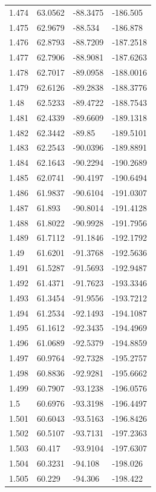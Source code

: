 \begin{tabular}{llll}
1.474 & 63.0562 & -88.3475 & -186.505 \\
1.475 & 62.9679 & -88.534 & -186.878 \\
1.476 & 62.8793 & -88.7209 & -187.2518 \\
1.477 & 62.7906 & -88.9081 & -187.6263 \\
1.478 & 62.7017 & -89.0958 & -188.0016 \\
1.479 & 62.6126 & -89.2838 & -188.3776 \\
1.48 & 62.5233 & -89.4722 & -188.7543 \\
1.481 & 62.4339 & -89.6609 & -189.1318 \\
1.482 & 62.3442 & -89.85 & -189.5101 \\
1.483 & 62.2543 & -90.0396 & -189.8891 \\
1.484 & 62.1643 & -90.2294 & -190.2689 \\
1.485 & 62.0741 & -90.4197 & -190.6494 \\
1.486 & 61.9837 & -90.6104 & -191.0307 \\
1.487 & 61.893 & -90.8014 & -191.4128 \\
1.488 & 61.8022 & -90.9928 & -191.7956 \\
1.489 & 61.7112 & -91.1846 & -192.1792 \\
1.49 & 61.6201 & -91.3768 & -192.5636 \\
1.491 & 61.5287 & -91.5693 & -192.9487 \\
1.492 & 61.4371 & -91.7623 & -193.3346 \\
1.493 & 61.3454 & -91.9556 & -193.7212 \\
1.494 & 61.2534 & -92.1493 & -194.1087 \\
1.495 & 61.1612 & -92.3435 & -194.4969 \\
1.496 & 61.0689 & -92.5379 & -194.8859 \\
1.497 & 60.9764 & -92.7328 & -195.2757 \\
1.498 & 60.8836 & -92.9281 & -195.6662 \\
1.499 & 60.7907 & -93.1238 & -196.0576 \\
1.5 & 60.6976 & -93.3198 & -196.4497 \\
1.501 & 60.6043 & -93.5163 & -196.8426 \\
1.502 & 60.5107 & -93.7131 & -197.2363 \\
1.503 & 60.417 & -93.9104 & -197.6307 \\
1.504 & 60.3231 & -94.108 & -198.026 \\
1.505 & 60.229 & -94.306 & -198.422 \\

\end{tabular}
